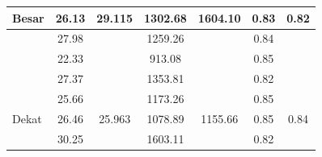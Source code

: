 \documentclass[conference]{IEEEtran}
\begin{document}
\begin{table}[]
\begin{tabular}{|l|cc|cc|cc|}
  \multirow{-5}{*}{Besar}                & \multicolumn{1}{c|}{\cellcolor[HTML]{FFFFFF}26.13} & \multirow{-5}{*}{\cellcolor[HTML]{FFFFFF}29.115} & \multicolumn{1}{c|}{\cellcolor[HTML]{FFFFFF}1302.68} & \multirow{-5}{*}{\cellcolor[HTML]{FFFFFF}1604.10} & \multicolumn{1}{c|}{\cellcolor[HTML]{FFFFFF}0.83} & \multirow{-5}{*}{\cellcolor[HTML]{FFFFFF}0.82} \\ \hline
                                                      & \multicolumn{1}{c|}{\cellcolor[HTML]{FFFFFF}27.98} & \cellcolor[HTML]{FFFFFF}                         & \multicolumn{1}{c|}{\cellcolor[HTML]{FFFFFF}1259.26} & \cellcolor[HTML]{FFFFFF}                           & \multicolumn{1}{c|}{\cellcolor[HTML]{FFFFFF}0.84} & \cellcolor[HTML]{FFFFFF}                        \\ \cline{2-2} \cline{4-4} \cline{6-6}
                                                      & \multicolumn{1}{c|}{\cellcolor[HTML]{FFFFFF}22.33} & \cellcolor[HTML]{FFFFFF}                         & \multicolumn{1}{c|}{\cellcolor[HTML]{FFFFFF}913.08}  & \cellcolor[HTML]{FFFFFF}                           & \multicolumn{1}{c|}{\cellcolor[HTML]{FFFFFF}0.85} & \cellcolor[HTML]{FFFFFF}                        \\ \cline{2-2} \cline{4-4} \cline{6-6}
                                                      & \multicolumn{1}{c|}{\cellcolor[HTML]{FFFFFF}27.37} & \cellcolor[HTML]{FFFFFF}                         & \multicolumn{1}{c|}{\cellcolor[HTML]{FFFFFF}1353.81} & \cellcolor[HTML]{FFFFFF}                           & \multicolumn{1}{c|}{\cellcolor[HTML]{FFFFFF}0.82} & \cellcolor[HTML]{FFFFFF}                        \\ \cline{2-2} \cline{4-4} \cline{6-6}
                                                      & \multicolumn{1}{c|}{\cellcolor[HTML]{FFFFFF}25.66} & \cellcolor[HTML]{FFFFFF}                         & \multicolumn{1}{c|}{\cellcolor[HTML]{FFFFFF}1173.26} & \cellcolor[HTML]{FFFFFF}                           & \multicolumn{1}{c|}{\cellcolor[HTML]{FFFFFF}0.85} & \cellcolor[HTML]{FFFFFF}                        \\ \cline{2-2} \cline{4-4} \cline{6-6}
  \multirow{-5}{*}{Dekat} & \multicolumn{1}{c|}{\cellcolor[HTML]{FFFFFF}26.46} & \multirow{-5}{*}{\cellcolor[HTML]{FFFFFF}25.963} & \multicolumn{1}{c|}{\cellcolor[HTML]{FFFFFF}1078.89} & \multirow{-5}{*}{\cellcolor[HTML]{FFFFFF}1155.66} & \multicolumn{1}{c|}{\cellcolor[HTML]{FFFFFF}0.85} & \multirow{-5}{*}{\cellcolor[HTML]{FFFFFF}0.84} \\ \hline
                                                      & \multicolumn{1}{c|}{\cellcolor[HTML]{FFFFFF}30.25} & \cellcolor[HTML]{FFFFFF}                         & \multicolumn{1}{c|}{\cellcolor[HTML]{FFFFFF}1603.11} & \cellcolor[HTML]{FFFFFF}                           & \multicolumn{1}{c|}{\cellcolor[HTML]{FFFFFF}0.82} & \cellcolor[HTML]{FFFFFF}                        \\ \cline{2-2} \cline{4-4} \cline{6-6}

\end{tabular}
\end{table}
\end{document}
